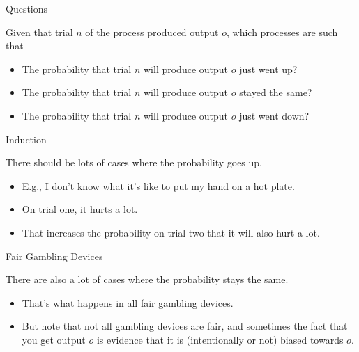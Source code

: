 \documentclass[
  ignorenonframetext,
]{beamer}
\providecommand{\tightlist}{%
  \setlength{\itemsep}{0pt}\setlength{\parskip}{0pt}}
\renewcommand{\,}{\text{, }}
\begin{document}
\begin{frame}{Questions}
\protect\hypertarget{questions}{}

Given that trial \(n\) of the process produced output \(o\), which
processes are such that

\begin{itemize}
\tightlist
\item
  The probability that trial \(n\) will produce output \(o\) just went
  up?
\item
  The probability that trial \(n\) will produce output \(o\) stayed the
  same?
\item
  The probability that trial \(n\) will produce output \(o\) just went
  down?
\end{itemize}

\end{frame}

\begin{frame}{Induction}
\protect\hypertarget{induction}{}

There should be lots of cases where the probability goes up.

\begin{itemize}[<+->]
\tightlist
\item
  E.g., I don't know what it's like to put my hand on a hot plate.
\item
  On trial one, it hurts a lot.
\item
  That increases the probability on trial two that it will also hurt a
  lot.
\end{itemize}

\end{frame}

\begin{frame}{Fair Gambling Devices}
\protect\hypertarget{fair-gambling-devices}{}

There are also a lot of cases where the probability stays the same.

\begin{itemize}[<+->]
\tightlist
\item
  That's what happens in all fair gambling devices.
\item
  But note that not all gambling devices are fair, and sometimes the
  fact that you get output \(o\) is evidence that it is (intentionally
  or not) biased towards \(o\).
\end{itemize}

\end{frame}
\end{document}
